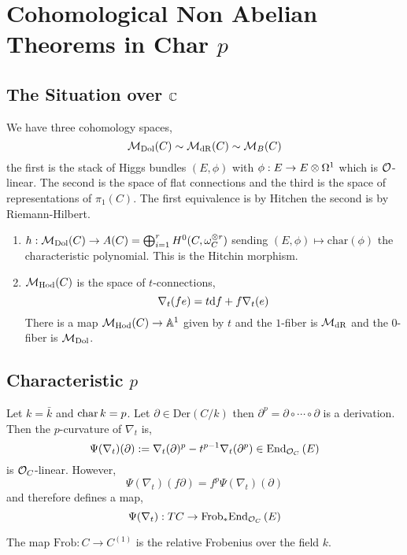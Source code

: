 \documentclass[12pt]{article}
\begin{document}
\section{Cohomological Non Abelian Theorems in Char $p$}

\subsection{The Situation over $\CC$}

We have three cohomology spaces,
\[ \M_{\text{Dol}}(C) \sim \M_{\dR}(C) \sim \M_{B}(C) \]
the first is the stack of Higgs bundles $(E, \phi)$ with $\phi : E \to E \ot \Omega^1$ which is $\struct{}$-linear. The second is the space of flat connections and the third is the space of representations of $\pi_1(C)$. The first equivalence is by Hitchen the second is by Riemann-Hilbert.

\begin{enumerate}
\item $h : \M_{\text{Dol}}(C) \to A(C) = \bigoplus_{i = 1}^r H^0(C, \omega_C^{\ot r})$
sending $(E, \phi) \mapsto \mathrm{char}(\phi)$ the characteristic polynomial. This is the Hitchin morphism.

\item $\M_{\text{Hod}}(C)$ is the space of $t$-connections,
\[ \nabla_t(f e) = t \d{f} + f \nabla_t(e) \]
There is a map $\M_{\text{Hod}}(C) \to \A^1$ given by $t$ and the $1$-fiber is $\M_{\dR}$ and the $0$-fiber is $\M_{\text{Dol}}$.
\end{enumerate} 

\subsection{Characteristic $p$}

\newcommand{\Frob}{\mathrm{Frob}}

Let $k = \bar{k}$ and $\ch{k} = p$. Let $\partial \in \mathrm{Der}(C/k)$ then $\partial^p = \partial \circ \cdots \circ \partial$ is a derivation. Then the $p$-curvature of $\nabla_t$ is,
\[ \Psi(\nabla_t)(\partial) := \nabla_t(\partial)^p - t^{p-1} \nabla_t(\partial^p) \in \End[\struct{C}]{E} \]
is $\struct{C}$-linear. However,
\[ \Psi(\nabla_t)(f \partial) = f^p \Psi(\nabla_t)(\partial) \]
and therefore defines a map,
\[ \Psi(\nabla_t) : TC \to \Frob_* \End[\struct{C}]{E} \]

\begin{rmk}
The map $\Frob : C \to C^{(1)}$ is the relative Frobenius over the field $k$.
\end{rmk}
\end{document}
